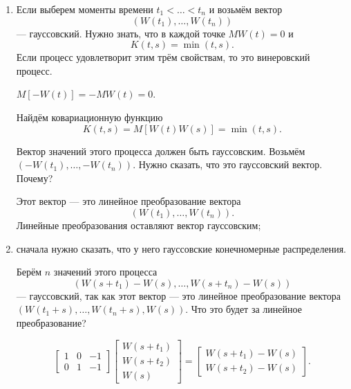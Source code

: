 \begin{enumerate}[label=\alph*)]
  \item Если выберем моменты времени $t_1 < \dotsc < t_n$ и возьмём вектор
  $$ \left( W \left( t_1 \right), \dotsc, W \left( t_n \right) \right) $$
  --- гауссовский.
  Нужно знать, что в каждой точке $MW \left( t \right) = 0$ и
  $$K \left( t, s \right) =
    \min \left( t, s \right).$$
  Если процесс удовлетворит этим трём свойствам, то это винеровский процесс.

  $M \left[ -W \left( t \right) \right] =
    -MW \left( t \right) =
    0$.

  Найдём ковариационную функцию
  $$K \left( t, s \right) =
    M \left[ W \left( t \right) W \left( s \right) \right] =
    \min \left( t, s \right).$$

  Вектор значений этого процесса должен быть гауссовским.
  Возьмём $ \left( -W \left( t_1 \right), \dotsc, -W \left( t_n \right) \right) $.
  Нужно сказать, что это гауссовский вектор.
  Почему?

  Этот вектор --- это линейное преобразование вектора
  $$ \left( W \left( t_1 \right), \dotsc, W \left( t_n \right) \right).$$
  Линейные преобразования оставляют вектор гауссовским;
  \item сначала нужно сказать, что у него гауссовские конечномерные распределения.

  Берём $n$ значений этого процесса
  $$ \left(
      W \left( s + t_1 \right) - W \left( s \right), \dotsc,
      W \left( s + t_n \right) - W \left( s \right)
    \right) $$
  --- гауссовский, так как этот вектор --- это линейное преобразование вектора
  $ \left( W \left( t_1 + s \right), \dotsc, W \left( t_n + s \right), W \left( s \right) \right) $.
  Что это будет за линейное преобразование?

  $$ \begin{bmatrix}
      1 & 0 & -1 \\
      0 & 1 & -1
    \end{bmatrix}
    \begin{bmatrix}
      W \left( s + t_1 \right) \\
      W \left( s + t_2 \right) \\
      W \left( s \right)
    \end{bmatrix} =
    \begin{bmatrix}
      W \left( s + t_1 \right) - W \left( s \right) \\
      W \left( s + t_2 \right) - W \left( s \right)
    \end{bmatrix}.$$


\end{enumerate}
